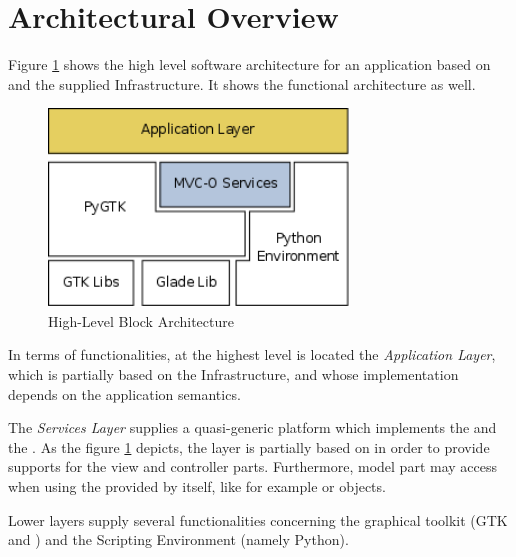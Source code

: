 \section{\label{ARCH} Architectural Overview}

Figure \ref{HLA_f} shows the high level software architecture for an
application based on \pygtk and the supplied \mvco Infrastructure.  It
shows the functional architecture as well.

\begin{figure}[htbp]
\begin{center}
\includegraphics[width=8cm]{figs/png/arch}
\caption{\label{HLA_f}High-Level Block Architecture}
\end{center}
\end{figure}

In terms of functionalities, at the highest level is located the
\emph{Application Layer}, which is partially based on the \mvco
Infrastructure, and whose implementation depends on the application
semantics.

The \emph{\mvco Services Layer} supplies a quasi-generic platform
which implements the \mvc and the \obs. As the figure \ref{HLA_f}
depicts, the \mvco layer is partially based on \pygtk in order to
provide supports for the view and controller parts. Furthermore, model
part may access \pygtk when using the \mvc provided by \pygtk itself,
like for example  or 
objects.

Lower layers supply several functionalities concerning the graphical
toolkit (GTK and \glade) and the Scripting Environment (namely
Python).




